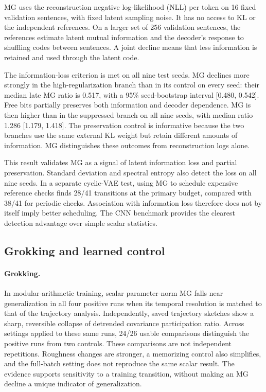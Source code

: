 {MG uses the reconstruction negative log-likelihood (NLL) per token on 16 fixed validation sentences, with fixed latent sampling noise. It has no access to KL or the independent references. On a larger set of 256 validation sentences, the references estimate latent mutual information and the decoder's response to shuffling codes between sentences. A joint decline means that less information is retained and used through the latent code.

The information-loss criterion is met on all nine test seeds. MG declines more strongly in the high-regularization branch than in its control on every seed: their median late MG ratio is 0.517, with a 95\% seed-bootstrap interval [0.480, 0.542]. Free bits partially preserves both information and decoder dependence. MG is then higher than in the suppressed branch on all nine seeds, with median ratio 1.286 [1.179, 1.418]. The preservation control is informative because the two branches use the same external KL weight but retain different amounts of information. MG distinguishes these outcomes from reconstruction logs alone.

This result validates MG as a signal of latent information loss and partial preservation. Standard deviation and spectral entropy also detect the loss on all nine seeds. In a separate cyclic-VAE test, using MG to schedule expensive reference checks finds 28/41 transitions at the primary budget, compared with 38/41 for periodic checks. Association with information loss therefore does not by itself imply better scheduling. The CNN benchmark provides the clearest detection advantage over simple scalar statistics.

\subsection{Grokking and learned control}
\paragraph{Grokking.}
In modular-arithmetic training, scalar parameter-norm MG falls near generalization in all four positive runs when its temporal resolution is matched to that of the trajectory analysis. Independently, saved trajectory sketches show a sharp, reversible collapse of detrended covariance participation ratio. Across settings applied to these same runs, 24/26 usable comparisons distinguish the positive runs from two controls. These comparisons are not independent repetitions. Roughness changes are stronger, a memorizing control also simplifies, and the full-batch setting does not reproduce the same scalar result. The evidence supports sensitivity to a training transition, without making an MG decline a unique indicator of generalization.

}
